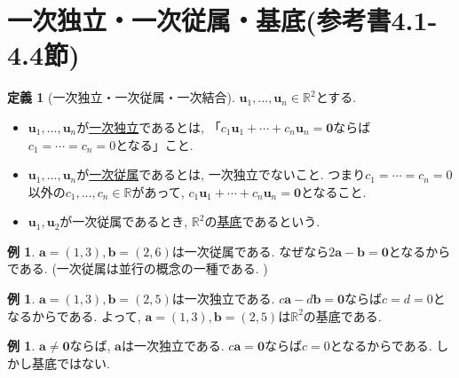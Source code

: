 \documentclass[dvipdfmx,a4paper,11pt]{article}
\newcommand{\R}{\mathbb{R}}
\theoremstyle{definition}
\newtheorem{dfn}[thm]{定義}
\newtheorem{exa}[thm]{例}
\begin{document}
 \section{一次独立・一次従属・基底(参考書4.1-4.4節)}
\label{sec-3}
\begin{tcolorbox}[
    colback = white,
    colframe = green!35!black,
    fonttitle = \bfseries,
    breakable = true]
    \begin{dfn}[一次独立・一次従属・一次結合]
  $\bm{u}_1, \ldots, \bm{u}_n \in \R^2 $とする. 
    \begin{itemize}
	\setlength{\parskip}{0cm}
  	\setlength{\itemsep}{0pt} 
\item $\bm{u}_1, \ldots, \bm{u}_n $が\underline{一次独立}であるとは, 
「$c_1\bm{u}_1 + \cdots+ c_n\bm{u}_n = \bm{0}$ならば$c_1=\cdots =c_n =0$となる」こと.
\item $\bm{u}_1, \ldots, \bm{u}_n $が\underline{一次従属}であるとは, 
一次独立でないこと. つまり$c_1=\cdots =c_n =0$以外の$c_1, \ldots, c_n \in \R$があって, $c_1\bm{u}_1 + \cdots + c_n\bm{u}_n = \bm{0}$となること.
\item $\bm{u}_1, \bm{u}_2 $が一次従属であるとき, $\R^2$の\underline{基底}であるという. 
\end{itemize}
    \end{dfn}
 \end{tcolorbox}

 \begin{exa}
$\bm{a}=(1,3), \bm{b} = (2,6)$は一次従属である.
 なぜなら$2\bm{a} - \bm{b} =\bm{0}$となるからである. (一次従属は並行の概念の一種である. )
 \end{exa}
 
  \begin{exa}
 $\bm{a}=(1,3), \bm{b} = (2,5)$は一次独立である.
$c\bm{a} - d\bm{b} =\bm{0}$ならば$c=d=0$となるからである. 
よって, $\bm{a}=(1,3), \bm{b} = (2,5)$は$\R^2$の基底である. 
\end{exa}

 \begin{exa}
$\bm{a}\neq \bm{0}$ならば, $\bm{a}$は一次独立である.
$c\bm{a} =\bm{0}$ならば$c=0$となるからである. 
しかし基底ではない. 
\end{exa}
\end{document}
